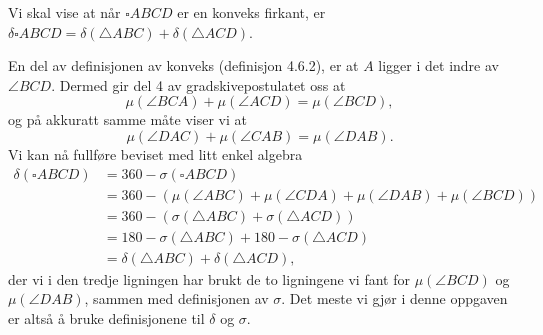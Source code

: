 \begin{oppgave}[4.8.2]
    Vi skal vise at når $\square ABCD$ er en konveks firkant, er $\delta \square ABCD = \delta (\triangle ABC)+\delta(\triangle ACD)$. 

    En del av definisjonen av konveks (definisjon 4.6.2), er at $A$ ligger i det indre av $\angle BCD$. 
    Dermed gir del 4 av gradskivepostulatet oss at 
    $$\mu(\angle BCA)+\mu(\angle ACD)=\mu(\angle BCD),$$
    og på akkuratt samme måte viser vi at 
    $$\mu(\angle DAC)+\mu(\angle CAB)=\mu(\angle DAB).$$
    Vi kan nå fullføre beviset med litt enkel algebra
    \begin{align*}
        \delta(\square ABCD)
        &= 360 - \sigma(\square ABCD) \\
        &= 360 - (\mu(\angle ABC)+\mu(\angle CDA)+\mu(\angle DAB)+\mu(\angle BCD))\\
        &= 360 - (\sigma(\triangle ABC)+\sigma(\triangle ACD))\\
        &= 180 - \sigma(\triangle ABC)+ 180-\sigma(\triangle ACD)\\
        &= \delta(\triangle ABC)+\delta(\triangle ACD),
    \end{align*}
    der vi i den tredje ligningen har brukt de to ligningene vi fant for $\mu(\angle BCD)$ og $\mu(\angle DAB)$, sammen med definisjonen av $\sigma$.
    Det meste vi gjør i denne oppgaven er altså å bruke definisjonene til $\delta$ og $\sigma$. 
\end{oppgave}

